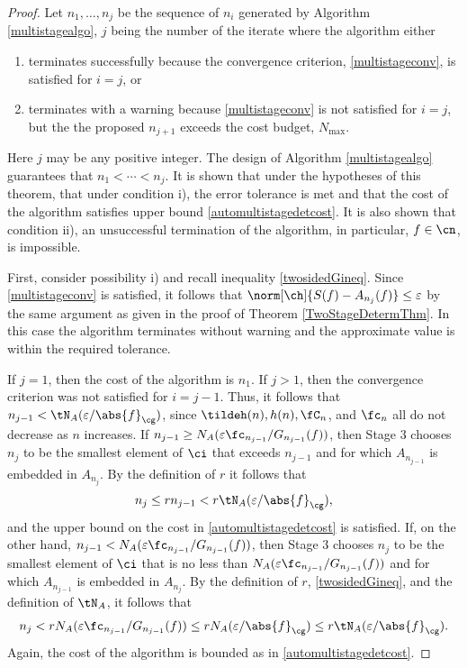 \documentclass[]{elsarticle}
\theoremstyle{definition}
\theoremstyle{remark}
\newcommand{\Gnorm}[1]{\abs{#1}_{\cg}}
\begin{document}
\begin{proof} Let $n_1, \ldots, n_{j}$ be the sequence of $n_i$ generated by Algorithm \ref{multistagealgo}, $j$ being the number of the iterate where the algorithm either 
\begin{enumerate}
\renewcommand{\labelenumi}{\roman{enumi})}
\item terminates successfully because the convergence criterion, \eqref{multistageconv}, is satisfied for $i=j$, or 

\item terminates with a warning because \eqref{multistageconv} is not satisfied for $i=j$, but the the proposed $n_{j+1}$ exceeds the cost budget, $N_{\max}$. 

\end{enumerate}
Here $j$ may be any positive integer.  The design of Algorithm \ref{multistagealgo} guarantees that $n_1 < \cdots < n_j$.  It is shown that under the hypotheses of this theorem, that under condition i), the error tolerance is met and that the cost of the algorithm satisfies upper bound \eqref{automultistagedetcost}. It is also shown that condition ii), an unsuccessful termination of the algorithm, in particular, $f \in \cn$, is impossible.  

First, consider possibility i) and recall inequality \eqref{twosidedGineq}.
Since \eqref{multistageconv} is satisfied, it follows that $\norm[\ch]{S(f)-A_{n_j}(f)} \le \varepsilon$ by the same argument as given in the proof of Theorem \ref{TwoStageDetermThm}.  In this case the algorithm terminates without warning and the approximate value is within the required tolerance.

If $j=1$, then the cost of the algorithm is $n_1$.  If $j>1$, then the convergence criterion was not satisfied for $i=j-1$. Thus, it follows that $n_{j-1} < \tN_A(\varepsilon/\Gnorm{f})$, since $\tildeh(n), h(n), \fC_n$, and $\fc_n$ all do not decrease as $n$ increases. 
If $n_{j-1} \ge N_{A}(\varepsilon \fc_{n_{j-1}}/G_{n_{j-1}}(f))$, then Stage 3 chooses $n_{j}$ to be the smallest element of $\ci$ that exceeds $n_{j-1}$ and for which $A_{n_{j-1}}$ is embedded in $A_{n_j}$.  By the definition of $r$ it follows that
\begin{equation*}
n_{j} \le r  n_{j-1} < r \tN_{A}(\varepsilon/\Gnorm{f}),
\end{equation*}
and the upper bound on the cost in \eqref{automultistagedetcost} is satisfied.
If, on the other hand, $n_{j-1} < N_{A}(\varepsilon \fc_{n_{j-1}}/G_{n_{j-1}}(f))$, then Stage 3 chooses $n_{j}$ to be the smallest element of $\ci$ that is no less than $N_{A}(\varepsilon \fc_{n_{j-1}}/G_{n_{j-1}}(f))$ and for which $A_{n_{j-1}}$ is embedded in $A_{n_j}$.  By the definition of $r$, \eqref{twosidedGineq}, and the definition of $\tN_A$, it follows that
\begin{equation*}
n_{j} < r  N_{A}(\varepsilon \fc_{n_{j-1}}/G_{n_{j-1}}(f)) \le r  N_{A}(\varepsilon/\Gnorm{f}) \le r \tN_{A}(\varepsilon/\Gnorm{f}).
\end{equation*}
Again, the cost of the algorithm is bounded as in \eqref{automultistagedetcost}.


\end{proof}
\end{document}
